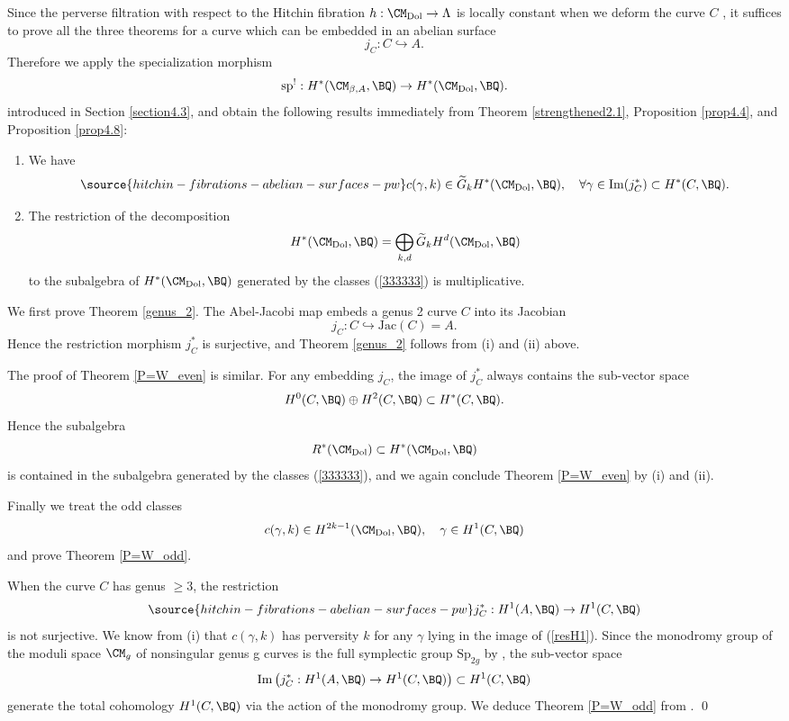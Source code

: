 Since the perverse filtration with respect to the Hitchin fibration $h: \CM_{\mathrm{Dol}} \to \Lambda$ is locally constant when we deform the curve $C$ \cite{dCM}, it suffices to prove all the three theorems for a curve which can be embedded in an abelian surface
\[
j_C: C\hookrightarrow A.
\]
Therefore we apply the specialization morphism
\[
\mathrm{sp}^!: H^*(\CM_{\beta, A}, \BQ) \to H^*(\CM_{\mathrm{Dol}}, \BQ).
\]
introduced in Section \ref{section4.3}, and obtain the following results immediately from Theorem \ref{strengthened2.1}, Proposition \ref{prop4.4}, and Proposition \ref{prop4.8}:
\begin{enumerate}
    \item[(i)] We have
    \begin{equation}\label{333333}
\source{hitchin-fibrations-abelian-surfaces-pw}
    c(\gamma, k) \in \widetilde{G}_kH^*(\CM_{\mathrm{Dol}}, \BQ), \quad \forall \gamma \in \mathrm{Im}({j_C^*}) \subset H^*(C, \BQ).
    \end{equation}
    \item[(ii)] The restriction of the decomposition \[
    H^*(\CM_{\mathrm{Dol}}, \BQ)= \bigoplus_{k,d}\widetilde{G}_kH^d(\CM_{\mathrm{Dol}}, \BQ)
    \]to the subalgebra of $H^*(\CM_{\mathrm{Dol}}, \BQ)$ generated by the classes (\ref{333333}) is multiplicative.
\end{enumerate}

We first prove Theorem \ref{genus_2}. The Abel-Jacobi map embeds a genus 2 curve $C$ into its Jacobian
\[
j_C: C \hookrightarrow \mathrm{Jac}(C) = A.
\]
Hence the restriction morphism $j_C^*$ is surjective, and Theorem \ref{genus_2} follows from (i) and (ii) above.

The proof of Theorem \ref{P=W_even} is similar. For any embedding $j_C$, the image of $j_C^*$ always contains the sub-vector space
\[
H^0(C, \BQ) \oplus H^2(C, \BQ) \subset H^*(C, \BQ).
\]
Hence the subalgebra
\[
R^*(\CM_{\mathrm{Dol}}) \subset H^*(\CM_{\mathrm{Dol}}, \BQ)
\]
is contained in the subalgebra generated by the classes (\ref{333333}), and we again conclude Theorem \ref{P=W_even} by (i) and (ii).

Finally we treat the odd classes
\[
c(\gamma, k) \in H^{2k-1}(\CM_{\mathrm{Dol}}, \BQ), \quad \gamma\in H^1(C, \BQ)
\]
and prove Theorem \ref{P=W_odd}.

When the curve $C$ has genus $\geq 3$, the restriction
\begin{equation}\label{resH1}
\source{hitchin-fibrations-abelian-surfaces-pw}
j_C^*: H^1(A, \BQ) \to H^1(C, \BQ)
\end{equation}
is not surjective. We know from (i) that $c(\gamma, k)$ has perversity $k$ for any $\gamma$ lying in the image of (\ref{resH1}). Since the monodromy group of the moduli space $\CM_g$ of nonsingular genus g curves is the full symplectic group $\mathrm{Sp}_{2g}$ by \cite{A}, the sub-vector space
\[
\mathrm{Im}\left({j_C^*}:H^1(A, \BQ)\to H^1(C,\BQ) \right) \subset H^1(C, \BQ)
\]
generate the total cohomology $H^1(C, \BQ)$ via the action of the monodromy group. We deduce Theorem \ref{P=W_odd} from \cite{dCM}. \qed
